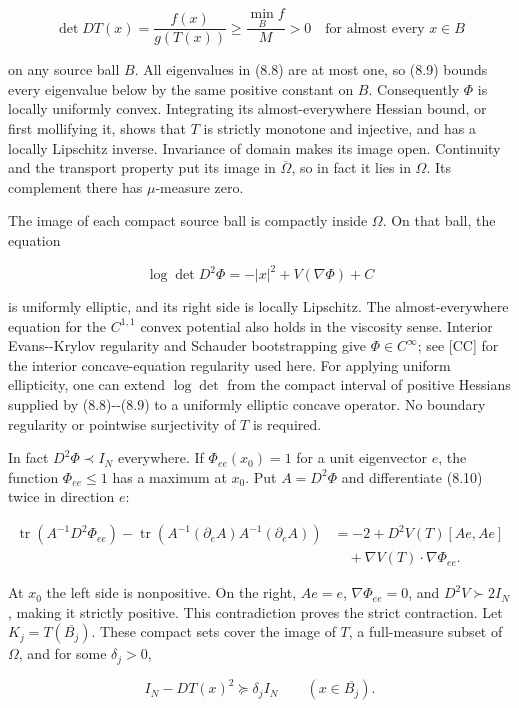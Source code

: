 \documentclass[11pt]{article}
\begin{document}
\[\det DT(x)=\frac{f(x)}{g(T(x))}\geq\frac{\min_{B}f}{M}>0
\quad\text{for almost every }x\in B\tag{8.9}\]

on any source ball \(B\). All eigenvalues in (8.8) are at most one, so
(8.9) bounds every eigenvalue below by the same positive constant on
\(B\). Consequently \(\Phi\) is locally uniformly convex. Integrating
its almost-everywhere Hessian bound, or first mollifying it, shows that
\(T\) is strictly monotone and injective, and has a locally Lipschitz
inverse. Invariance of domain makes its image open. Continuity and the
transport property put its image in \(\overline\Omega\), so in fact it
lies in \(\Omega\). Its complement there has \(\mu\)-measure zero.

The image of each compact source ball is compactly inside \(\Omega\). On
that ball, the equation

\[\log\det D^2\Phi=-|x|^2+V(\nabla\Phi)+C\tag{8.10}\]

is uniformly elliptic, and its right side is locally Lipschitz. The
almost-everywhere equation for the \(C^{1,1}\) convex potential also
holds in the viscosity sense. Interior Evans-\/-Krylov regularity and
Schauder bootstrapping give \(\Phi\in C^\infty\); see {[}CC{]} for the
interior concave-equation regularity used here. For applying uniform
ellipticity, one can extend \(\log\det\) from the compact interval of
positive Hessians supplied by (8.8)-\/-(8.9) to a uniformly elliptic
concave operator. No boundary regularity or pointwise surjectivity of
\(T\) is required.

In fact \(D^2\Phi\prec I_N\) everywhere. If \(\Phi_{ee}(x_0)=1\) for a
unit eigenvector \(e\), the function \(\Phi_{ee}\leq1\) has a maximum at
\(x_0\). Put \(A=D^2\Phi\) and differentiate (8.10) twice in direction
\(e\):

\[\begin{aligned}
\operatorname{tr}(A^{-1}D^2\Phi_{ee})
-\operatorname{tr}(A^{-1}(\partial_eA)A^{-1}(\partial_eA))
&=-2+D^2V(T)[Ae,Ae]\\
&\quad+\nabla V(T)\cdot\nabla\Phi_{ee}.
\end{aligned}\tag{8.11}\]

At \(x_0\) the left side is nonpositive. On the right, \(Ae=e\),
\(\nabla\Phi_{ee}=0\), and \(D^2V\succ2I_N\), making it strictly
positive. This contradiction proves the strict contraction. Let
\(K_j=T(\overline{B_j})\). These compact sets cover the image of \(T\),
a full-measure subset of \(\Omega\), and for some \(\delta_j>0\),

\[I_N-DT(x)^2\succeq\delta_j I_N\qquad(x\in\overline{B_j}).\tag{8.12}\]
\end{document}
